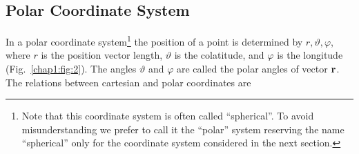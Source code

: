 \subsection{Polar Coordinate System}\label{sec:1.1.2}
In a polar coordinate system\footnote{Note that this coordinate system is often called ``spherical''. To avoid misunderstanding we prefer to call it the ``polar'' system reserving the name ``spherical'' only for the coordinate system considered in the next section.} the position of a point is determined by \(r, \vartheta, \varphi\), where \(r\) is the position vector length, \(\vartheta\) is the colatitude, and \(\varphi\) is the longitude (Fig.~\ref{chap1:fig:2}). The angles \(\vartheta\) and \(\varphi\) are called the polar angles of vector \(\mathbf{r}\). The relations between cartesian and polar coordinates are

